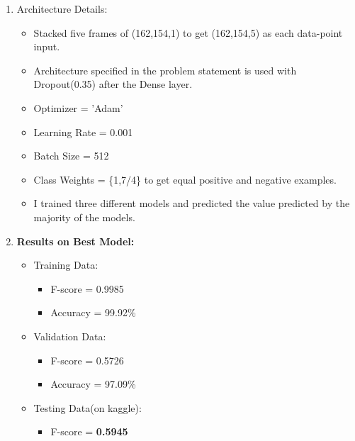 \documentclass[a4 paper]{article}
\begin{document}
\begin{enumerate}
    \item Architecture Details:
    \begin{itemize}
        \item Stacked five frames of (162,154,1) to get (162,154,5) as each data-point input.
        \item Architecture specified in the problem statement is used with Dropout(0.35) after the Dense layer.
        \item Optimizer = 'Adam'
        \item Learning Rate = 0.001
        \item Batch Size = 512
        \item Class Weights = \{1,7/4\} to get equal positive and negative examples.
        \item I trained three different models and predicted the value predicted by the majority of the models.
    \end{itemize}

    \item \textbf{Results on Best Model:}
    \begin{itemize}
        \item Training Data:
            \begin{itemize}
                \item F-score = 0.9985
                \item Accuracy = 99.92\%
            \end{itemize}
        \item Validation Data:
            \begin{itemize}
                \item F-score = 0.5726
                \item Accuracy = 97.09\%
            \end{itemize}
        \item Testing Data(on kaggle):
            \begin{itemize}
                \item F-score = \textbf{0.5945}
            \end{itemize}
    \end{itemize}

\end{enumerate}
\end{document}
